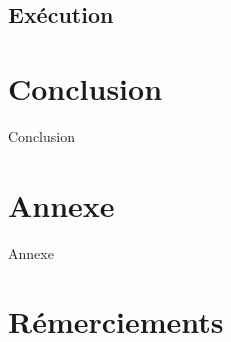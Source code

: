 \documentclass[a4paper,10pt]{article}
\begin{document}
\subsection{Exécution}

\section{Conclusion}

Conclusion

\section{Annexe}

Annexe

\section*{R\'emerciements}
\newpage


\end{document}
